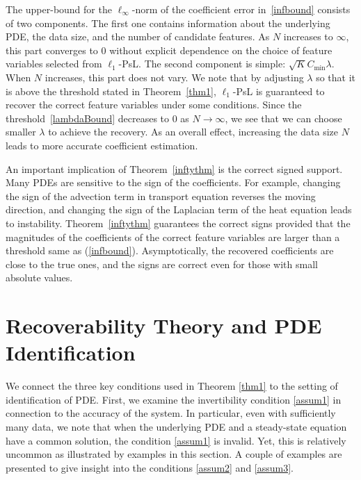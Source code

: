 \documentclass[a4paper,11pt]{article}
\theoremstyle{definition}
\begin{document}
The upper-bound for the $\ell_\infty$-norm of the coefficient error in~\eqref{infbound} consists of two components. The first one contains information about the underlying PDE, the data size, and the number of candidate features. As $N$ increases to $\infty$, this part converges to $0$ without explicit dependence on the choice of feature variables selected from $\ell_1$-PsL. The second component is simple: $\sqrt{K}C_{\min}\lambda$. When $N$ increases, this part does not vary.   We note that by adjusting $\lambda$ so that it is above the threshold stated in Theorem~\ref{thm1}, $\ell_1$-PsL is guaranteed to recover the correct feature variables under some conditions. Since the threshold~\eqref{lambdaBound} decreases to $0$ as $N\to\infty$, we see that we can choose smaller $\lambda$ to achieve the recovery. As an overall effect,  increasing the data size $N$ leads to more accurate coefficient estimation.

An important implication of Theorem~\ref{inftythm} is the correct signed support. Many PDEs are sensitive to the sign of the coefficients. For example, changing the sign of the advection term in transport equation reverses the moving direction, and changing the sign of the Laplacian term of the heat equation leads to instability.  Theorem~\ref{inftythm} guarantees the correct signs provided that the magnitudes of the coefficients of the correct feature variables are larger than a threshold same as (\ref{infbound}).  Asymptotically, the recovered coefficients are close to the true ones, and the signs are correct even for those with small absolute values.



\section{Recoverability Theory and PDE Identification} \label{sec:pde}

We connect the three key conditions used in Theorem \ref{thm1} to the setting of identification of PDE.   First, we examine the invertibility condition \eqref{assum1} in connection to the accuracy of the system.  In particular,  even with sufficiently many data, we note that when the underlying PDE and a steady-state equation have a common solution, the condition \eqref{assum1} is invalid.  Yet, this is relatively uncommon as illustrated by examples in this section.  A couple of examples are presented to give insight into the conditions \eqref{assum2} and \eqref{assum3}.
\end{document}
